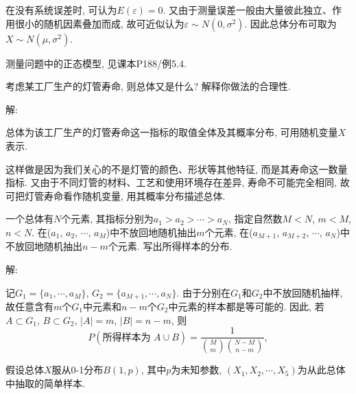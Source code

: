 \documentclass[standard]{ExBook}
\renewenvironment{shaded}{%
  \def\FrameCommand{\fboxsep=\FrameSep \colorbox{shadecolor}}%
  \MakeFramed{\advance\hsize-\width \FrameRestore}%
}{%
  \endMakeFramed
}
\begin{document}
\begin{qitems}
在没有系统误差时, 可认为$E(\varepsilon)=0$. 又由于测量误差一般由大量彼此独立、作用很小的随机因素叠加而成, 故可近似认为$\varepsilon\sim N(0,\sigma^2)$. 因此总体分布可取为$X\sim N(\mu,\sigma^2)$.

\textcolor{themeColor}{\selectfont {} 测量问题中的正态模型, 见课本P188/例5.4.}

\vspace{2.5cm-5em}

    \begin{bbox}
    \begin{shaded}
        \qitem
考虑某工厂生产的灯管寿命, 则总体又是什么? 解释你做法的合理性.
    \end{shaded}
    \end{bbox}

\vspace{\dimexpr2.5cm-5em\relax}

解:

总体为该工厂生产的灯管寿命这一指标的取值全体及其概率分布, 可用随机变量$X$表示.

这样做是因为我们关心的不是灯管的颜色、形状等其他特征, 而是其寿命这一数量指标. 又由于不同灯管的材料、工艺和使用环境存在差异, 寿命不可能完全相同, 故可把灯管寿命看作随机变量, 用其概率分布描述总体.

\vspace{2.5cm-5em}

    \begin{bbox}
    \begin{shaded}
        \qitem
一个总体有$N$个元素, 其指标分别为$a_1 > a_2 > \cdots > a_N$, 指定自然数$M < N$, $m < M$, $n < N$. 在($a_1$, $a_2$, $\cdots$, $a_M$)中不放回地随机抽出$m$个元素, 在($a_{M+1}$, $a_{M+2}$, $\cdots$, $a_{N}$)中不放回地随机抽出$n-m$个元素. 写出所得样本的分布.
    \end{shaded}
    \end{bbox}

\vspace{\dimexpr2.5cm-5em\relax}

解:

记$G_1=\{a_1,\cdots,a_M\}$, $G_2=\{a_{M+1},\cdots,a_N\}$. 由于分别在$G_1$和$G_2$中不放回随机抽样, 故任意含有$m$个$G_1$中元素和$n-m$个$G_2$中元素的样本都是等可能的. 因此, 若$A\subset G_1$, $B\subset G_2$, $|A|=m$, $|B|=n-m$, 则
$$P(\text{所得样本为 }A\cup B)=\frac{1}{\binom{M}{m}\binom{N-M}{n-m}},$$

\vspace{2.5cm-5em}

    \begin{bbox}
    \begin{shaded}
        \qitem
假设总体$X$服从0-1分布$B(1,p)$, 其中$p$为未知参数, $(X_1, X_2, \cdots, X_5)$为从此总体中抽取的简单样本.


\end{shaded}
\end{bbox}
\end{qitems}
\end{document}
